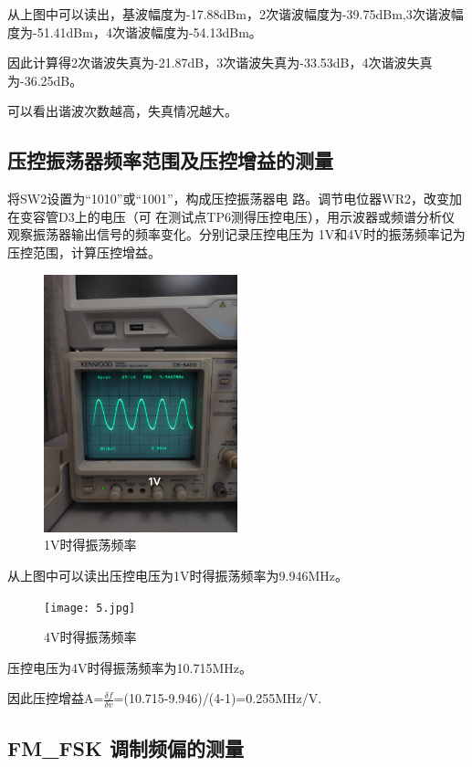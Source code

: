 \documentclass{../source/Experiment}
\begin{document}
        从上图中可以读出，基波幅度为-17.88dBm，2次谐波幅度为-39.75dBm,3次谐波幅度为-51.41dBm，4次谐波幅度为-54.13dBm。

        因此计算得2次谐波失真为-21.87dB，3次谐波失真为-33.53dB，4次谐波失真为-36.25dB。

        可以看出谐波次数越高，失真情况越大。

        \subsection{压控振荡器频率范围及压控增益的测量}

        将SW2设置为“1010”或“1001”，构成压控振荡器电
        路。调节电位器WR2，改变加在变容管D3上的电压（可
        在测试点TP6测得压控电压），用示波器或频谱分析仪
        观察振荡器输出信号的频率变化。分别记录压控电压为
        1V和4V时的振荡频率记为压控范围，计算压控增益。
        \begin{figure}[H]
            \centering
            \includegraphics[width = 0.5\textwidth]{lab3/4.jpg}
            \caption{1V时得振荡频率}    
        \end{figure}
        从上图中可以读出压控电压为1V时得振荡频率为9.946MHz。

        \begin{figure}[H]
            \centering
            \texttt{[image: 5.jpg]}
            \caption{4V时得振荡频率}    
        \end{figure}
        压控电压为4V时得振荡频率为10.715MHz。

        因此压控增益A=$\frac{\delta f}{\delta v}$=(10.715-9.946)/(4-1)=0.255MHz/V.
        
        \subsection{FM\_FSK 调制频偏的测量}
\end{document}
